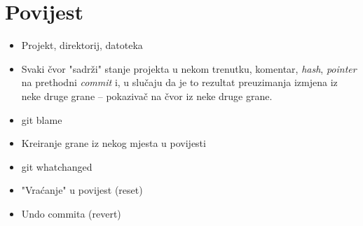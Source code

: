 \chapter*{Povijest}

\begin{itemize}
	\item Projekt, direktorij, datoteka
	\item Svaki čvor "sadrži" stanje projekta u nekom trenutku, komentar, \emph{hash}, \emph{pointer} na prethodni \emph{commit} i, u slučaju da je to rezultat preuzimanja izmjena iz neke druge grane -- pokazivač na čvor iz neke druge grane.
	\item git blame
	\item Kreiranje grane iz nekog mjesta u povijesti
	\item git whatchanged
	\item "Vraćanje" u povijest (reset)
	\item Undo commita (revert)
\end{itemize}


